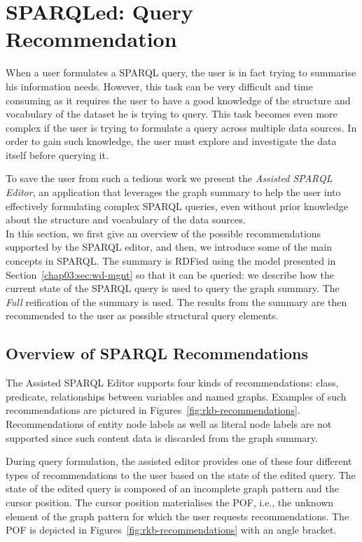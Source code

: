 \section{SPARQLed: Query Recommendation}
\label{sec:exploiting:sparqled:recommendation}

When a user formulates a SPARQL query, the user is in fact trying to summarise his information needs. However, this task can be very difficult and time consuming as it requires the user to have a good knowledge of the structure and vocabulary of the dataset he is trying to query. This task becomes even more complex if the user is trying to formulate a query across multiple data sources. In order to gain such knowledge, the user must explore and investigate the data itself before querying it.

To save the user from such a tedious work we present the \emph{Assisted SPARQL Editor}, an application that leverages the graph summary to help the user into effectively formulating complex SPARQL queries, even without prior knowledge about the structure and vocabulary of the data sources.\\

In this section, we first give an overview of the possible recommendations supported by the SPARQL editor, and then, we introduce some of the main concepts in SPARQL. The summary is RDFied using the model presented in Section~\ref{chap03:sec:wd-mgnt} so that it can be queried: we describe how the current state of the SPARQL query is used to query the graph summary. The \emph{Full} reification of the summary is used. The results from the summary are then recommended to the user as possible structural query elements.

\subsection{Overview of SPARQL Recommendations}

The Assisted SPARQL Editor supports four kinds of recommendations: class, predicate, relationships between variables and named graphs. Examples of such recommendations are pictured in Figures~\ref{fig:rkb-recommendations}. Recommendations of entity node labels as well as literal node labels are not supported since such content data is discarded from the graph summary.

During query formulation, the assisted editor provides one of these four different types of recommendations to the user based on the state of the edited query. The state of the edited query is composed of an incomplete graph pattern and the cursor position. The cursor position materialises the \gls{POF}, i.e., the unknown element of the graph pattern for which the user requests recommendations. The \gls{POF} is depicted in Figures~\ref{fig:rkb-recommendations} with an angle bracket.


